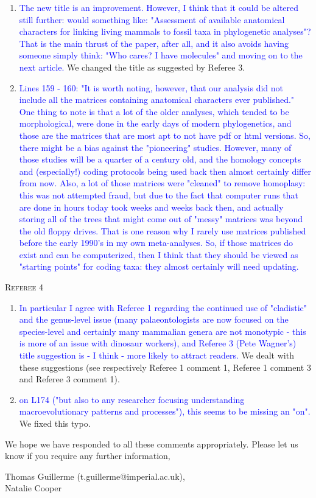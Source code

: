 \documentclass[12pt,letterpaper]{article}
\renewcommand{\section}[1]{%
\bigskip
\begin{center}
\begin{Large}
\normalfont\scshape #1
\medskip
\end{Large}
\end{center}}
\begin{document}
\begin{enumerate}
\item{\textcolor{blue}{The new title is an improvement.  However, I think that it could be altered still further: would something like: "Assessment of available anatomical characters for linking living mammals to fossil taxa in phylogenetic analyses"?  That is the main thrust of the paper, after all, and it also avoids having someone simply think: "Who cares? I have molecules" and moving on to the next article.}}
We changed the title as suggested by Referee 3.

\item{\textcolor{blue}{Lines 159 - 160: "It is worth noting, however, that our analysis did not include all the matrices containing anatomical characters ever published."
One thing to note is that a lot of the older analyses, which tended to be morphological, were done in the early days of modern phylogenetics, and those are the matrices that are most apt to not have pdf or html versions.  So, there might be a bias against the "pioneering" studies.  However, many of those studies will be a quarter of a century old, and the homology concepts and (especially!) coding protocols being used back then almost certainly differ from now.  Also, a lot of those matrices were "cleaned" to remove homoplasy: this was not attempted fraud, but due to the fact that computer runs that are done in hours today took weeks and weeks back then, and actually storing all of the trees that might come out of "messy" matrices was beyond the old floppy drives.  That is one reason why I rarely use matrices published before the early 1990's in my own meta-analyses.  So, if those matrices do exist and can be computerized, then I think that they should be viewed as "starting points" for coding taxa: they almost certainly will need updating.}}


\end{enumerate}

\section{Referee 4}

\begin{enumerate}

\item{\textcolor{blue}{In particular I agree with Referee 1 regarding the continued use of "cladistic" and the genus-level issue (many palaeontologists are now focused on the species-level and certainly many mammalian genera are not monotypic - this is more of an issue with dinosaur workers), and Referee 3 (Pete Wagner's) title suggestion is - I think - more likely to attract readers.}}
We dealt with these suggestions (see respectively Referee 1 comment 1, Referee 1 comment 3 and Referee 3 comment 1).


\item{\textcolor{blue}{on L174 ("but also to any researcher focusing understanding macroevolutionary patterns and processes"), this seems to be missing an "on".}}
We fixed this typo.
\end{enumerate}



We hope we have responded to all these comments appropriately. Please let us know if you require any further information,\\
\bigskip


Thomas Guillerme (t.guillerme@imperial.ac.uk),\\
Natalie Cooper
\end{document}
